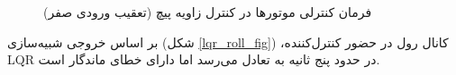 \begin{figure}[H]
	\centering
	\caption{‫‪فرمان کنترلی موتورها در کنترل زاویه پیچ (تعقیب ورودی صفر)}
\end{figure}

بر اساس خروجی شبیه‌سازی (شکل
\ref{lqr_roll_fig})
،کانال رول در حضور کنترل‌کننده LQR در حدود پنج ثانیه به تعادل می‌رسد اما دارای خطای ماندگار است. 